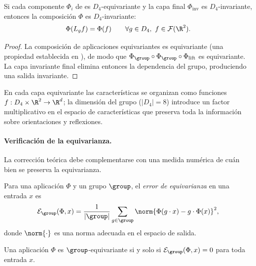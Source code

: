 \begin{theorem}
\label{thm:groups:composition-invariance}
Si cada componente $\Phi_i$ de  es
$D_4$-equivariante y la capa final $\Phi_{\text{inv}}$ es $D_4$-invariante,
entonces la composici\'on $\Phi$ es $D_4$-invariante:
\begin{equation}
  \Phi(L_g f) = \Phi(f) \qquad \forall g \in D_4,\ f \in \mathcal{F}(\R^2).
\end{equation}
\end{theorem}

\begin{proof}
La composici\'on de aplicaciones equivariantes es equivariante (una propiedad
establecida en ), de modo que $\Phi_{\group} \circ \Phi_{\group}
\circ \Phi_{\text{lift}}$ es equivariante. La capa invariante final elimina
entonces la dependencia del grupo, produciendo una salida invariante.
\end{proof}

En cada capa equivariante las caracter\'isticas se organizan como funciones $f:
D_4 \times \R^2 \to \R^d$; la dimensi\'on del grupo ($|D_4| = 8$) introduce un
factor multiplicativo en el espacio de caracter\'isticas que preserva toda la
informaci\'on sobre orientaciones y reflexiones.

\paragraph{Verificaci\'on de la equivarianza.}
La correcci\'on te\'orica debe complementarse con una medida num\'erica de cu\'an
bien se preserva la equivarianza.

\begin{definition}
\label{def:groups:equivariance-error}
Para una aplicaci\'on $\Phi$ y un grupo $\group$, el \emph{error de equivarianza}
en una entrada $x$ es
\begin{equation}
  \mathcal{E}_{\group}(\Phi, x)
  = \frac{1}{|\group|} \sum_{g \in \group}
    \norm{\Phi(g \cdot x) - g \cdot \Phi(x)}^2,
\end{equation}
donde $\norm{\cdot}$ es una norma adecuada en el espacio de salida.
\end{definition}

\begin{theorem}
\label{thm:groups:equivariance-criterion}
Una aplicaci\'on $\Phi$ es $\group$-equivariante si y solo si
$\mathcal{E}_{\group}(\Phi,x) = 0$ para toda entrada $x$.
\end{theorem}

